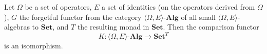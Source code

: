 Let $\Omega$ be a set of operators, $E$ a set of identities (on the operators derived from $\Omega$), $G$ the forgetful functor from the category $\langle \Omega, E \rangle\text{-}\mathbf{Alg}$ of all small $\langle \Omega, E \rangle$-algebras to $\mathbf{Set}$, and $T$ the resulting monad in $\mathbf{Set}$. Then the comparison functor
$$K : \langle \Omega, E \rangle\text{-}\mathbf{Alg} \to \mathbf{Set}^T$$
is an isomorphism.
